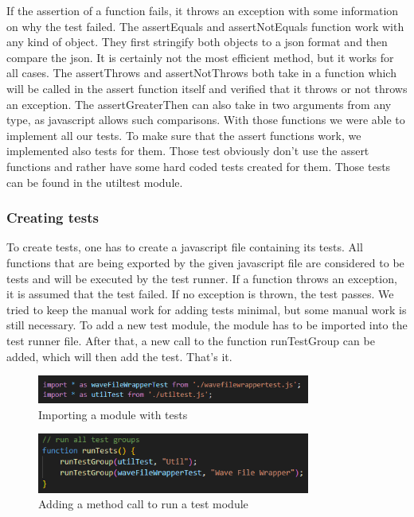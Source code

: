 If the assertion of a function fails, it throws an exception with some information on why the test failed.
The assertEquals and assertNotEquals function work with any kind of object.
They first stringify both objects to a json format and then compare the json.
It is certainly not the most efficient method, but it works for all cases.
The assertThrows and assertNotThrows both take in a function which will be called in the assert function itself and verified that it throws or not throws an exception.
The assertGreaterThen can also take in two arguments from any type, as javascript allows such comparisons.
With those functions we were able to implement all our tests.
To make sure that the assert functions work, we implemented also tests for them.
Those test obviously don't use the assert functions and rather have some hard coded tests created for them.
Those tests can be found in the utiltest module.

\subsubsection{Creating tests}
To create tests, one has to create a javascript file containing its tests.
All functions that are being exported by the given javascript file are considered to be tests and will be executed by the test runner.
If a function throws an exception, it is assumed that the test failed.
If no exception is thrown, the test passes.
We tried to keep the manual work for adding tests minimal, but some manual work is still necessary.
To add a new test module, the module has to be imported into the test runner file.
After that, a new call to the function runTestGroup can be added, which will then add the test.
That's it.

\begin{figure}[H]
    \centering
    \includegraphics[width=0.8\textwidth]{../assets/import_test_module.png}
    \caption{Importing a module with tests}\label{fig:importing-module-with-tests}
\end{figure}

\begin{figure}[H]
    \centering
    \includegraphics[width=0.8\textwidth]{../assets/add_call_to_runTestGroup.png}
    \caption{Adding a method call to run a test module}\label{fig:adding-a-method-call-to-run-a-test-module}
\end{figure}

